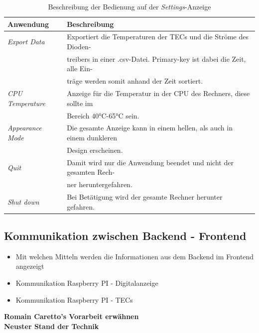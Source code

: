 \begin{table}[H]
    \centering
    \begin{tabular}{l|l}
         \textbf{Anwendung}&        \textbf{Beschreibung}\\
         \hline
         \textit{Export Data}&      Exportiert die Temperaturen der TECs und die Ströme des Dioden-\\
         &                          treibers in einer .csv-Datei. Primary-key ist dabei die Zeit, alle Ein-\\
         &                          träge werden somit anhand der Zeit sortiert.\\
         \textit{CPU Temperature}&  Anzeige für die Temperatur in der CPU des Rechners, diese sollte im\\
         &                          Bereich 40°C-65°C sein.\\
         \textit{Appearance Mode}&  Die gesamte Anzeige kann in einem hellen, als auch in einem dunkleren\\
         &                          Design erscheinen.\\
         \textit{Quit}&             Damit wird nur die Anwendung beendet und nicht der gesamten Rech-\\
         &                          ner heruntergefahren.\\
         \textit{Shut down}&        Bei Betätigung wird der gesamte Rechner herunter gefahren.
    \end{tabular}
    \caption{Beschreibung der Bedienung auf der \textit{Settings}-Anzeige}
    \label{tab:settings_beschriebung_sw}
\end{table}

\subsection{Kommunikation zwischen Backend - Frontend}

\begin{itemize}
    \item Mit welchen Mitteln werden die Informationen aus dem Backend im Frontend angezeigt
    \item Kommunikation Raspberry PI - Digitalanzeige
    \item Kommunikation Raspberry PI - TECs
\end{itemize}

\textbf{Romain Caretto's Vorarbeit erwähnen}\\
\textbf{Neuster Stand der Technik}


